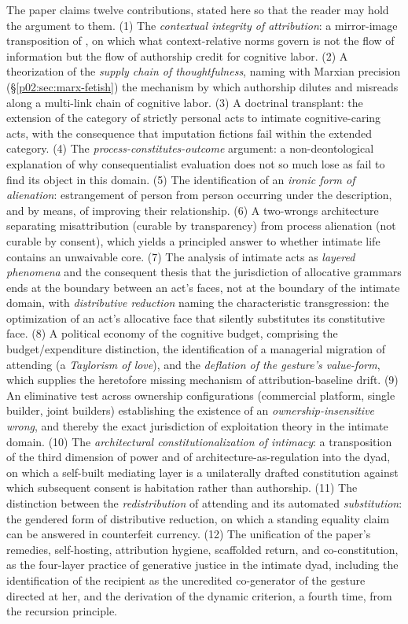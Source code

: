 \documentclass[11pt,a4paper]{article}
\newcommand{\term}[1]{\textit{\textcolor{pinkitalic}{#1}}}
\begin{document}
The paper claims twelve contributions, stated here so that the reader may hold the argument to them. (1) The \term{contextual integrity of attribution}: a mirror-image transposition of \textcite{nissenbaum2009privacy}, on which what context-relative norms govern is not the flow of information but the flow of authorship credit for cognitive labor. (2) A theorization of the \term{supply chain of thoughtfulness}, naming with Marxian precision (\S\ref{p02:sec:marx-fetish}) the mechanism by which authorship dilutes and misreads along a multi-link chain of cognitive labor. (3) A doctrinal transplant: the extension of the category of strictly personal acts to intimate cognitive-caring acts, with the consequence that imputation fictions fail within the extended category. (4) The \term{process-constitutes-outcome} argument: a non-deontological explanation of why consequentialist evaluation does not so much lose as fail to find its object in this domain. (5) The identification of an \term{ironic form of alienation}: estrangement of person from person occurring under the description, and by means, of improving their relationship. (6) A two-wrongs architecture separating misattribution (curable by transparency) from process alienation (not curable by consent), which yields a principled answer to whether intimate life contains an unwaivable core. (7) The analysis of intimate acts as \term{layered phenomena} and the consequent thesis that the jurisdiction of allocative grammars ends at the boundary between an act's faces, not at the boundary of the intimate domain, with \term{distributive reduction} naming the characteristic transgression: the optimization of an act's allocative face that silently substitutes its constitutive face. (8) A political economy of the cognitive budget, comprising the budget/expenditure distinction, the identification of a managerial migration of attending (a \term{Taylorism of love}), and the \term{deflation of the gesture's value-form}, which supplies the heretofore missing mechanism of attribution-baseline drift. (9) An eliminative test across ownership configurations (commercial platform, single builder, joint builders) establishing the existence of an \term{ownership-insensitive wrong}, and thereby the exact jurisdiction of exploitation theory in the intimate domain. (10) The \term{architectural constitutionalization of intimacy}: a transposition of the third dimension of power and of architecture-as-regulation into the dyad, on which a self-built mediating layer is a unilaterally drafted constitution against which subsequent consent is habitation rather than authorship. (11) The distinction between the \term{redistribution} of attending and its automated \term{substitution}: the gendered form of distributive reduction, on which a standing equality claim can be answered in counterfeit currency. (12) The unification of the paper's remedies, self-hosting, attribution hygiene, scaffolded return, and co-constitution, as the four-layer practice of generative justice in the intimate dyad, including the identification of the recipient as the uncredited co-generator of the gesture directed at her, and the derivation of the dynamic criterion, a fourth time, from the recursion principle.
\end{document}
